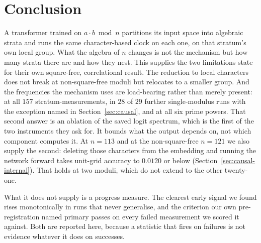 \section{Conclusion}
\label{sec:conclusion}

A transformer trained on $a \cdot b \bmod n$ partitions its input space into algebraic strata
and runs the same character-based clock on each one, on that stratum's own local group. What
the algebra of $n$ changes is not the mechanism but how many strata there are and how they
nest. This supplies the two limitations \citet{chen2026multiplication} state for their own
square-free, correlational result. The reduction to local characters does not break at
non-square-free moduli but relocates to a smaller group. And the frequencies the mechanism
uses are load-bearing rather than merely present: at all $157$ stratum-measurements, in
$28$ of $29$ further single-modulus runs with the exception named in
Section~\ref{sec:causal}, and at all six prime powers. That second answer is an ablation
of the saved logit spectrum, which is the first of the two instruments they ask for. It
bounds what the output depends on, not which component computes it. At $n = 113$ and at
the non-square-free $n = 121$ we also supply the second: deleting those characters from the
embedding and running the network forward takes unit-grid accuracy to $0.0120$ or below
(Section~\ref{sec:causal-internal}). That holds at two moduli, which do not extend to the
other twenty-one.

What it does not supply is a progress measure. The clearest early signal we found rises
monotonically in runs that never generalise, and the criterion our own pre-registration named
primary passes on every failed measurement we scored it against. Both are reported here,
because a statistic that fires on failures is not evidence whatever it does on successes.
